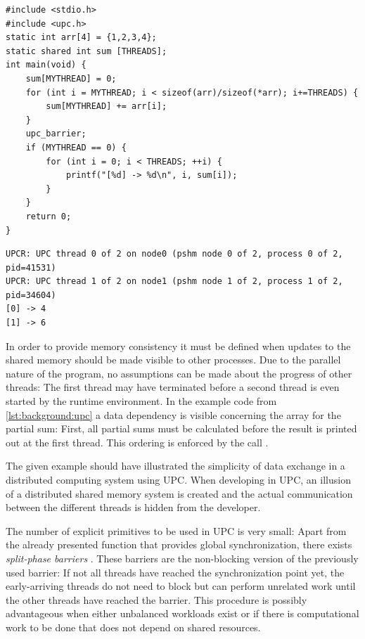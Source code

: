 \begin{lstlisting}[style=cpp,captionpos={b},caption={Example code in \ac{UPC}.},label=lst:background:upc]
#include <stdio.h>
#include <upc.h>
static int arr[4] = {1,2,3,4};
static shared int sum [THREADS];
int main(void) {
	sum[MYTHREAD] = 0;
	for (int i = MYTHREAD; i < sizeof(arr)/sizeof(*arr); i+=THREADS) {
		sum[MYTHREAD] += arr[i];
	}
	upc_barrier;
	if (MYTHREAD == 0) {
		for (int i = 0; i < THREADS; ++i) {
			printf("[%d] -> %d\n", i, sum[i]);
		}
	}
	return 0;
}
\end{lstlisting}

\begin{lstlisting}[style=console,captionpos={b},caption={Generated output of the code in \autoref{lst:background:upc}.},label=lst:background:upc-out]
UPCR: UPC thread 0 of 2 on node0 (pshm node 0 of 2, process 0 of 2, pid=41531)
UPCR: UPC thread 1 of 2 on node1 (pshm node 1 of 2, process 1 of 2, pid=34604)
[0] -> 4
[1] -> 6
\end{lstlisting}

In order to provide memory consistency it must be defined when updates to the shared memory should be made visible to other processes. Due to the parallel nature of the program, no assumptions can be made about the progress of other threads: The first thread may have terminated before a second thread is even started by the runtime environment. In the example code from \autoref{lst:background:upc} a data dependency is visible concerning the array for the partial sum: First, all partial sums must be calculated before the result is printed out at the first thread. This ordering is enforced by the  call \cite[ch.~1.4]{upc}.

The given example should have illustrated the simplicity of data exchange in a distributed computing system using \ac{UPC}. When developing in \ac{UPC}, an illusion of a distributed shared memory system is created and the actual communication between the different threads is hidden from the developer. 

The number of explicit primitives to be used in \ac{UPC} is very small: Apart from the already presented  function that provides global synchronization, there exists \emph{split-phase barriers} \cite[ch.~6.2]{upc}. These barriers are the non-blocking version of the previously used barrier: If not all threads have reached the synchronization point yet, the early-arriving threads do not need to block but can perform unrelated work until the other threads have reached the barrier. This procedure is possibly advantageous when either unbalanced workloads exist or if there is computational work to be done that does not depend on shared resources.

